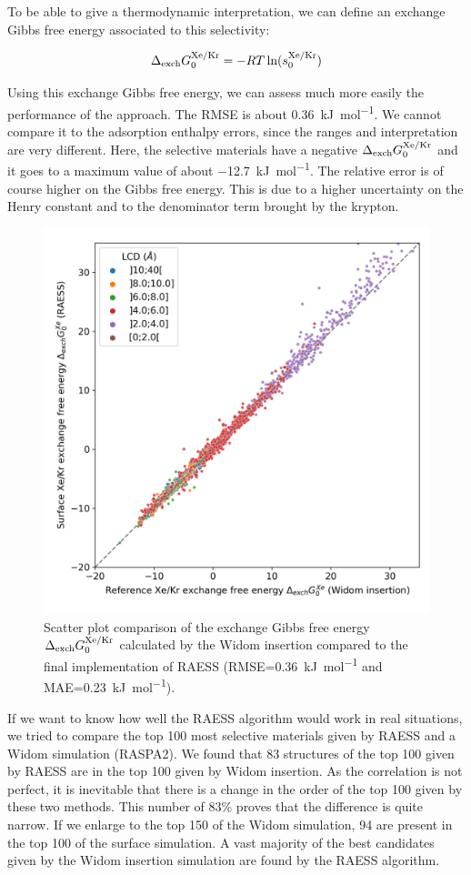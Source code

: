 \documentclass[main]{subfiles}
\begin{document}
To be able to give a thermodynamic interpretation, we can define an exchange Gibbs free energy associated to this selectivity:

\begin{equation}
    \Delta_{\text{exch}}G_{\text{0}}^{\text{Xe/Kr}} = - RT \ln(s_0^{\text{Xe/Kr}})
\end{equation}

Using this exchange Gibbs free energy, we can assess much more easily the performance of the approach. The RMSE is about \SI{0.36}{\kilo\joule\per\mole}. We cannot compare it to the adsorption enthalpy errors, since the ranges and interpretation are very different. Here, the selective materials have a negative $\Delta_{\text{exch}}G_{\text{0}}^{\text{Xe/Kr}}$ and it goes to a maximum value of about \SI{-12.7}{\kilo\joule\per\mole}. The relative error is of course higher on the Gibbs free energy. This is due to a higher uncertainty on the Henry constant and to the denominator term brought by the krypton.

\begin{figure}[ht]
\centering
  \includegraphics[width=0.5\linewidth]{figures/3-fastsim/G_XeKr_widom_vs_G_XeKr_surface_zoom.jpg}
  \caption{Scatter plot comparison of the exchange Gibbs free energy $\Delta_{\text{exch}}G_{\text{0}}^{\text{Xe/Kr}}$ calculated by the Widom insertion compared to the final implementation of RAESS (RMSE=\SI{0.36}{\kilo\joule\per\mole} and MAE=\SI{0.23}{\kilo\joule\per\mole}).}
  \label{fgr:exch_free_energy}
\end{figure}

If we want to know how well the RAESS algorithm would work in real situations, we tried to compare the top 100 most selective materials given by RAESS and a Widom simulation (RASPA2). We found that 83 structures of the top 100 given by RAESS are in the top 100 given by Widom insertion. As the correlation is not perfect, it is inevitable that there is a change in the order of the top 100 given by these two methods. This number of 83\% proves that the difference is quite narrow. If we enlarge to the top 150 of the Widom simulation, 94 are present in the top 100 of the surface simulation. A vast majority of the best candidates given by the Widom insertion simulation are found by the RAESS algorithm.
\end{document}
